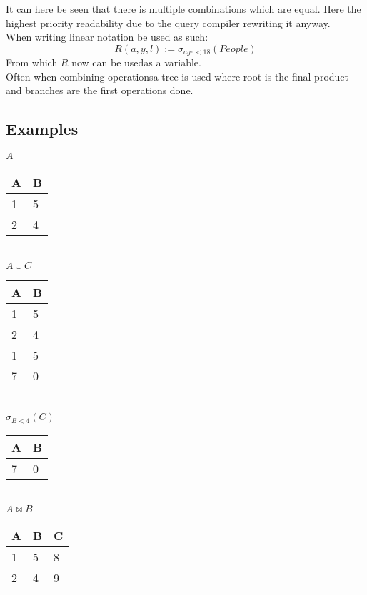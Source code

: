 \documentclass[12pt, a4paper]{article}
\begin{document}
		It can here be seen that there is multiple combinations which are equal. Here the highest priority readability due to the query compiler rewriting it anyway.\\
		When writing linear notation be used as such:
		$$R(a,y,l):=\sigma_{age<18}(People)$$
		From which $R$ now can be usedas a variable.\\
		Often when combining operationsa tree is used where root is the final product and branches are the first operations done.
		\subsection{Examples}
			\begin{minipage}[t]{0.32\textwidth}
				\begin{center}
				$A$\\
				\begin{tabular}{|l|l|}
				\hline
				A & B \\ \hline
				1 & 5 \\ \hline
				2 & 4 \\ \hline
				\end{tabular}\\[4mm]
				$A\cup C$\\
				\begin{tabular}{|l|l|}
				\hline
				A & B \\ \hline
				1 & 5 \\ \hline
				2 & 4 \\ \hline
				1 & 5 \\ \hline
				7 & 0 \\ \hline
				\end{tabular}\\[4mm]
				$\sigma_{B<4}(C)$\\
				\begin{tabular}{|l|l|}
				\hline
				A & B \\ \hline
				7 & 0 \\ \hline
				\end{tabular}\\[4mm]
				$A\bowtie B$\\
				\begin{tabular}{|l|l|l|}
				\hline
				 A & B & C \\ \hline
				 1 & 5 & 8 \\ \hline
				 2 & 4 & 9 \\ \hline
				\end{tabular}
				
				\end{center}
			\end{minipage}
\end{document}
